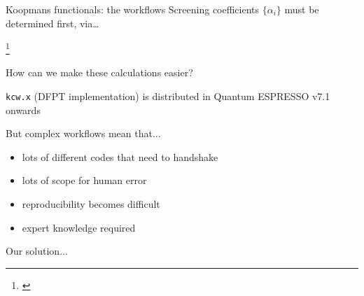 \documentclass[xcolor=table,aspectratio=169]{beamer}
\newcommand\blfootcite[1]{%
  \begingroup
  \renewcommand\thefootnote{}\footnote{\hspace{-4ex}\cite{#1}}%
  \addtocounter{footnote}{-1}%
  \endgroup
}
\numberwithin{equation}{section}
\begin{document}
\begin{frame}{Koopmans functionals: the workflows}
   \small Screening coefficients $\{\alpha_i\}$ must be determined first, via\dots

   \vspace{1ex}


   \vspace{-1.5ex}

    \blfootcite{DeGennaro2022,Colonna2022,Schubert2022}


\end{frame}

\begin{frame}{How can we make these calculations easier?}

   \texttt{kcw.x} (DFPT implementation) is distributed in Quantum ESPRESSO v7.1 onwards

   \vspace{4ex}

   But complex workflows mean that...
   \begin{itemize}
      \item lots of different codes that need to handshake
      \item lots of scope for human error
      \item reproducibility becomes difficult
      \item expert knowledge required
   \end{itemize}

   Our solution...

\end{frame}
\end{document}
